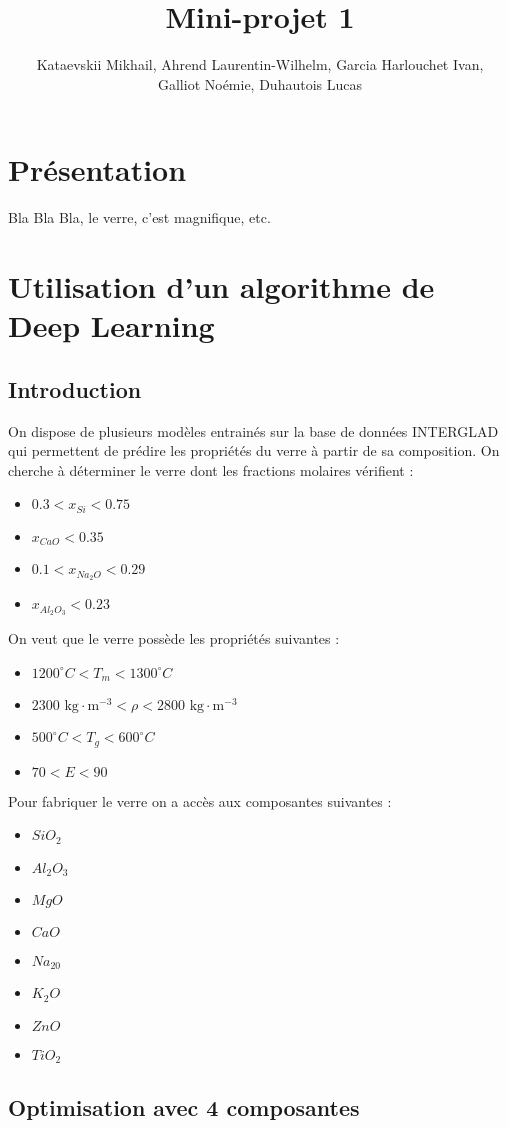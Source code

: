 \documentclass{article}
\title{Mini-projet 1}
\author{Kataevskii Mikhail, Ahrend Laurentin-Wilhelm, Garcia Harlouchet Ivan, \\ Galliot Noémie, Duhautois Lucas}
\begin{document}
\maketitle

\section{Présentation}

Bla Bla Bla, le verre, c'est magnifique, etc.

\section{Utilisation d'un algorithme de Deep Learning}
\subsection{Introduction}

On dispose de plusieurs modèles entrainés sur la base de données INTERGLAD qui permettent de prédire les propriétés du verre à partir de sa composition. On cherche à déterminer le verre dont les fractions molaires vérifient :
\begin{itemize}
    \item $0.3 < x_{Si} < 0.75$
    \item $x_{CaO} < 0.35$
    \item $0.1 < x_{Na_2O} < 0.29$
    \item $x_{Al_2O_3} < 0.23$
\end{itemize}
On veut que le verre possède les propriétés suivantes :
\begin{itemize}
    \item $1200 ^{\circ} C < T_m < 1300 ^{\circ} C$
    \item $2300 \text{ kg} \cdot \text{m}^{-3} < \rho < 2800 \text{ kg} \cdot \text{m}^{-3}$
    \item $500 ^{\circ} C < T_g < 600 ^{\circ} C$
    \item $70 < E < 90$
\end{itemize}
Pour fabriquer le verre on a accès aux composantes suivantes :
\begin{itemize}
    \item $SiO_2$
    \item $Al_2O_3$
    \item $MgO$
    \item $CaO$
    \item $Na_20$
    \item $K_2O$
    \item $ZnO$
    \item $TiO_2$
\end{itemize}

\subsection{Optimisation avec 4 composantes}
\end{document}
